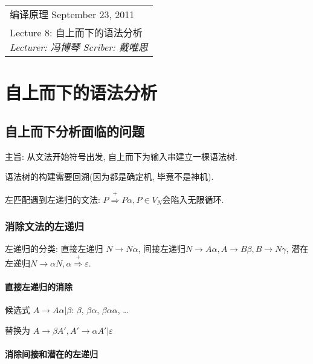 \def\lecture{8}
\clearpage \noindent\begin{tabularx}{\linewidth}{|X|}
\hline \vskip -2mm
{\sf 编译原理} \hfill September 23, 2011 \\
{\centering \sf \large Lecture \lecture:
自上而下的语法分析 \\ }
\textsl{Lecturer: 冯博琴 \hfill Scriber: 戴唯思}\\ \hline
\end{tabularx}
\setcounter{section}{0}
\renewcommand{\thepage}{\lecture -\arabic{page}}

\section{自上而下的语法分析}

    \subsection{自上而下分析面临的问题}

        主旨: 从文法开始符号出发, 自上而下为输入串建立一棵语法树. 

        语法树的构建需要回溯(因为都是确定机, 毕竟不是神机).

        左匹配遇到\textsf{左递归}的文法: $P\stackrel{+}{\Rightarrow}P\alpha, P\in V_N$会陷入无限循环.

        \subsubsection{消除文法的左递归}
        
            \textsf{左递归}的分类: 直接左递归 $N\to N\alpha$, 间接左递归$N\to A\alpha, A\to B\beta, B\to N\gamma$, 潜在左递归$N\to\alpha N, \alpha\stackrel{+}{\Rightarrow}\varepsilon$.

            \paragraph{直接左递归的消除}

                候选式 $A\to A\alpha|\beta$: $\beta$, $\beta\alpha$, $\beta\alpha\alpha$, \ldots

                替换为 $A\to\beta A', A'\to\alpha A'|\varepsilon$

            \paragraph{消除间接和潜在的左递归}

